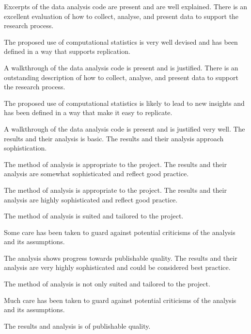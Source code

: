 \begin{markingrubric}
        \par		Excerpts of the data analysis code are present and are well explained.   
        \grade 		There is an excellent evaluation of how to collect, analyse, and present data to support the research process.
         \par		The proposed use of computational statistics is very well devised and has been defined in a way that supports replication.      
        \par		A walkthrough of the data analysis code is present and is justified.   
        \grade 		There is an outstanding description of how to collect, analyse, and present data to support the research process.
         \par		The proposed use of computational statistics is likely to lead to new insights and has been defined in a way that make it easy to replicate.        
        \par		A walkthrough of the data analysis code is present and is justified very well. 
%
        \grade\fail 
        \grade 		The results and their analysis is basic.
        \grade 		The results and their analysis approach sophistication.
        \par 		The method of analysis is appropriate to the project.
        \grade 		The results and their analysis are somewhat sophisticated and reflect good practice.
        \par 		The method of analysis is appropriate to the project.
        \grade 		The results and their analysis are highly sophisticated and reflect good practice.
        \par 		The method of analysis is suited and tailored to the project.
       \par 		Some care has been taken to guard against potential criticisms of the analysis and its assumptions.
        \par		The analysis shows progress towards publishable quality.
        \grade 		The results and their analysis are very highly sophisticated and could be considered best practice.
        \par 		The method of analysis is not only suited and tailored to the project.
        \par 		Much care has been taken to guard against potential criticisms of the analysis and its assumptions.
        \par		The results and analysis is of publishable quality.
%
        \grade\fail 

\end{markingrubric}
